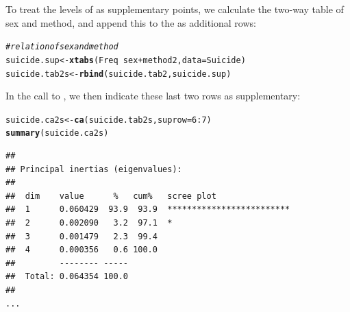 \documentclass[11pt]{book}\usepackage[]{graphicx}\usepackage[]{color}
\makeatletter
\newcommand{\hlnum}[1]{\textcolor[rgb]{0.686,0.059,0.569}{#1}}%
\newcommand{\hlcom}[1]{\textcolor[rgb]{0.678,0.584,0.686}{\textit{#1}}}%
\newcommand{\hlopt}[1]{\textcolor[rgb]{0,0,0}{#1}}%
\newcommand{\hlstd}[1]{\textcolor[rgb]{0.345,0.345,0.345}{#1}}%
\newcommand{\hlkwb}[1]{\textcolor[rgb]{0.69,0.353,0.396}{#1}}%
\newcommand{\hlkwc}[1]{\textcolor[rgb]{0.333,0.667,0.333}{#1}}%
\newcommand{\hlkwd}[1]{\textcolor[rgb]{0.737,0.353,0.396}{\textbf{#1}}}%
\newenvironment{kframe}{%
 \def\at@end@of@kframe{}%
 \ifinner\ifhmode%
  \def\at@end@of@kframe{\end{minipage}}%
  \begin{minipage}{\columnwidth}%
 \fi\fi%
 \def\FrameCommand##1{\hskip\@totalleftmargin \hskip-\fboxsep
 \colorbox{shadecolor}{##1}\hskip-\fboxsep
     \hskip-\linewidth \hskip-\@totalleftmargin \hskip\columnwidth}%
 \MakeFramed {\advance\hsize-\width
   \@totalleftmargin\z@ \linewidth\hsize
   \@setminipage}}%
 {\par\unskip\endMakeFramed%
 \at@end@of@kframe}
\newenvironment{knitrout}{}{} %
\renewenvironment{knitrout}{\small\renewcommand{\baselinestretch}{.85}}{} %
\makeatother
\begin{document}
To treat the levels of  as supplementary points, we calculate
the two-way table of sex and method, and append this to the 
 as additional rows:

\begin{knitrout}
\color{fgcolor}\begin{kframe}
\begin{alltt}
\hlcom{# relation of sex and method}
\hlstd{suicide.sup} \hlkwb{<-} \hlkwd{xtabs}\hlstd{(Freq} \hlopt{~} \hlstd{sex} \hlopt{+} \hlstd{method2,} \hlkwc{data}\hlstd{=Suicide)}
\hlstd{suicide.tab2s} \hlkwb{<-} \hlkwd{rbind}\hlstd{(suicide.tab2, suicide.sup)}
\end{alltt}
\end{kframe}
\end{knitrout}

In the call to , we then indicate these last two rows
as supplementary:
\begin{knitrout}
\color{fgcolor}\begin{kframe}
\begin{alltt}
\hlstd{suicide.ca2s} \hlkwb{<-} \hlkwd{ca}\hlstd{(suicide.tab2s,} \hlkwc{suprow}\hlstd{=}\hlnum{6}\hlopt{:}\hlnum{7}\hlstd{)}
\hlkwd{summary}\hlstd{(suicide.ca2s)}
\end{alltt}
\begin{verbatim}
## 
## Principal inertias (eigenvalues):
## 
##  dim    value      %   cum%   scree plot               
##  1      0.060429  93.9  93.9  *************************
##  2      0.002090   3.2  97.1  *                        
##  3      0.001479   2.3  99.4                           
##  4      0.000356   0.6 100.0                           
##         -------- -----                                 
##  Total: 0.064354 100.0                                 
## 
...
\end{verbatim}
\end{kframe}
\end{knitrout}
\end{document}
